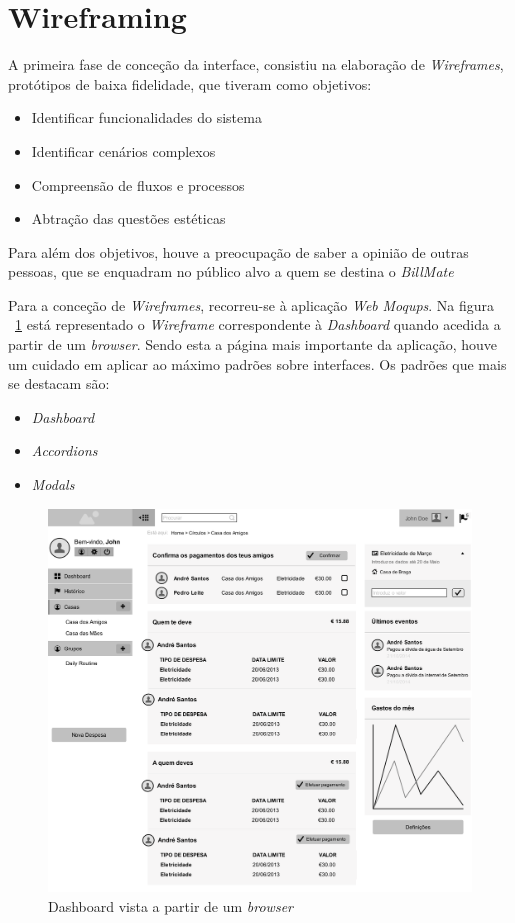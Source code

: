 \section{Wireframing}

A primeira fase de conceção da interface, consistiu na elaboração de \emph{Wireframes}, protótipos de baixa fidelidade, que tiveram como objetivos:

\begin{itemize}
	\item Identificar funcionalidades do sistema
	\item Identificar cenários complexos
	\item Compreensão de fluxos e processos
	\item Abtração das questões estéticas
\end{itemize}

Para além dos objetivos, houve a preocupação de saber a opinião de outras pessoas, que se enquadram no público alvo a quem se destina o \emph{BillMate}

Para a conceção de \emph{Wireframes}, recorreu-se à aplicação \emph{Web} \emph{Moqups}. Na figura ~\ref{fig:mockup_dashboard} está representado o \emph{Wireframe} correspondente à \emph{Dashboard} quando acedida a partir de um \emph{browser}. Sendo esta a página mais importante da aplicação, houve um cuidado em aplicar ao máximo padrões sobre interfaces. Os padrões que mais se destacam são:

\begin{itemize}
	\item \emph{Dashboard}
	\item \emph{Accordions}
	\item \emph{Modals}
\end{itemize}

\begin{figure}[ht]
\centering
\includegraphics[width=.9\textwidth]{images/mockup_dashboard}
\caption{Dashboard vista a partir de um \emph{browser}}
\label{fig:mockup_dashboard}
\end{figure}

